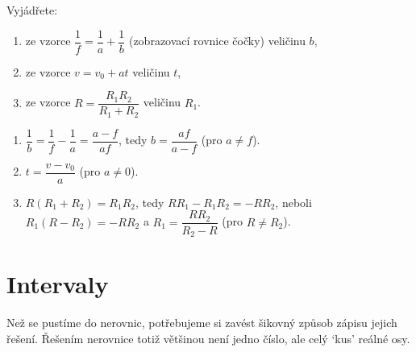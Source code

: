 \begin{problem}
  Vyjádřete:
  \begin{enumerate}[label=(\alph*)]
    \item ze vzorce $\dfrac{1}{f} = \dfrac{1}{a} + \dfrac{1}{b}$ (zobrazovací rovnice čočky) veličinu $b$,
    \item ze vzorce $v = v_0 + at$ veličinu $t$,
    \item ze vzorce $R = \dfrac{R_1R_2}{R_1 + R_2}$ veličinu $R_1$.
  \end{enumerate}
\end{problem}

\begin{solution}
  \begin{enumerate}[label=(\alph*)]
    \item $\dfrac{1}{b} = \dfrac{1}{f} - \dfrac{1}{a} = \dfrac{a - f}{af}$, tedy $b = \dfrac{af}{a - f}$ (pro $a\neq f$).
    \item $t = \dfrac{v - v_0}{a}$ (pro $a\neq 0$).
    \item $R(R_1 + R_2) = R_1R_2$, tedy $RR_1 - R_1R_2 = -RR_2$, neboli $R_1(R - R_2) = -RR_2$ a $R_1 = \dfrac{RR_2}{R_2 - R}$ (pro $R\neq R_2$).
  \end{enumerate}
\end{solution}

\section{Intervaly}\label{sec:intervaly}

Než se pustíme do nerovnic, potřebujeme si zavést šikovný způsob zápisu jejich řešení. Řešením nerovnice totiž většinou není jedno číslo, ale celý `kus' reálné osy.

